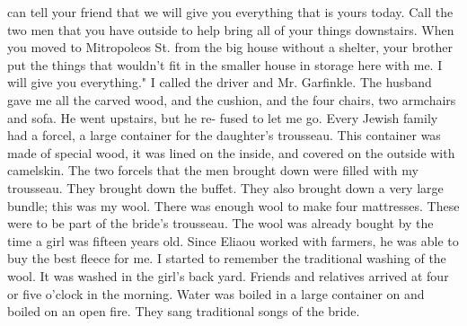 can tell your friend that we will give you everything that is yours today. Call the 
two men that you have outside to help bring all of your things downstairs. When 
you moved to Mitropoleos St. from the big house without a shelter, your brother put the 
things that wouldn't fit in the smaller house in storage here with me. I will give you 
everything." I called the driver and Mr. Garfinkle. The husband gave me all the carved wood, and 
the cushion, and the four chairs, two armchairs and sofa. He went upstairs, but he re-
fused to let me go. Every Jewish family had a forcel, a large container for the daughter's trousseau. This container was made of special wood, it was lined on the inside, 
and covered on the outside with camelskin. The two forcels that the men brought down 
were filled with my trousseau. They brought down the buffet. They also brought down a 
very large bundle; this was my wool. 
There was enough wool to make four mattresses. These were to be 
part of the bride's trousseau. The wool was already bought by the time 
a girl was fifteen years old. Since Eliaou worked with farmers, he was 
able to buy the best fleece for me. I started to remember the traditional washing of the wool. It was washed in the girl's back yard. 
Friends and relatives arrived at four or five o’clock in the morning. Water was boiled in a large container on 
and boiled on an open fire. They sang traditional songs of the bride.

